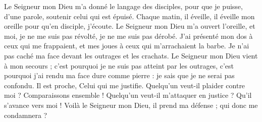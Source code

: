 Le Seigneur mon Dieu m’a donné le langage des disciples,
pour que je puisse, d’une parole,
soutenir celui qui est épuisé.
Chaque matin, il éveille,
il éveille mon oreille
pour qu’en disciple, j’écoute.
Le Seigneur mon Dieu m’a ouvert l’oreille,
et moi, je ne me suis pas révolté,
je ne me suis pas dérobé.
J’ai présenté mon dos à ceux qui me frappaient,
et mes joues à ceux qui m’arrachaient la barbe.
Je n’ai pas caché ma face devant les outrages et les crachats.
Le Seigneur mon Dieu vient à mon secours ;
c’est pourquoi je ne suis pas atteint par les outrages,
c’est pourquoi j’ai rendu ma face dure comme pierre :
je sais que je ne serai pas confondu.
Il est proche, Celui qui me justifie.
Quelqu’un veut-il plaider contre moi ?
Comparaissons ensemble !
Quelqu’un veut-il m’attaquer en justice ?
Qu’il s’avance vers moi !
Voilà le Seigneur mon Dieu, il prend ma défense ;
qui donc me condamnera ?